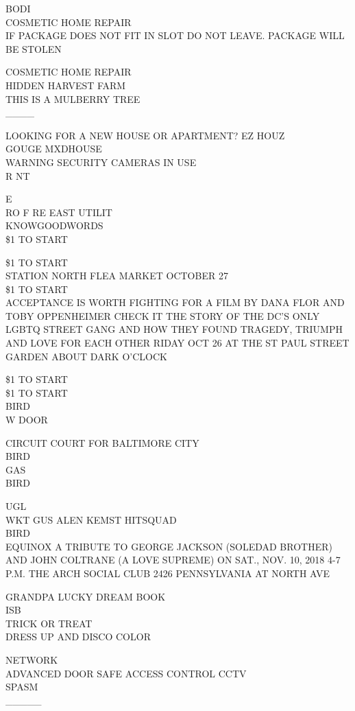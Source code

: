\documentclass[10pt,letterpaper]{article}
\begin{document}
BODI\\
COSMETIC HOME REPAIR\\
IF PACKAGE DOES NOT FIT IN SLOT DO NOT LEAVE.  PACKAGE WILL BE STOLEN

COSMETIC HOME REPAIR\\
HIDDEN HARVEST FARM\\
THIS IS A MULBERRY TREE\\
\_\_\_\_

LOOKING FOR A NEW HOUSE OR APARTMENT?  EZ HOUZ\\
GOUGE MXDHOUSE\\
WARNING SECURITY CAMERAS IN USE\\
R NT

E\\
RO F RE EAST UTILIT\\
KNOWGOODWORDS\\
\$1 TO START

\$1 TO START\\
STATION NORTH FLEA MARKET OCTOBER 27\\
\$1 TO START\\
ACCEPTANCE IS WORTH FIGHTING FOR A FILM BY DANA FLOR AND TOBY OPPENHEIMER CHECK IT THE STORY OF THE DC'S ONLY LGBTQ STREET GANG AND HOW THEY FOUND TRAGEDY, TRIUMPH AND LOVE FOR EACH OTHER RIDAY OCT 26 AT THE ST PAUL STREET GARDEN ABOUT DARK O'CLOCK

\$1 TO START\\
\$1 TO START\\
BIRD\\
W DOOR

CIRCUIT COURT FOR BALTIMORE CITY\\
BIRD\\
GAS\\
BIRD

UGL\\
WKT GUS ALEN KEMST HITSQUAD\\
BIRD\\
EQUINOX A TRIBUTE TO GEORGE JACKSON (SOLEDAD BROTHER) AND JOHN COLTRANE (A LOVE SUPREME) ON SAT., NOV. 10, 2018 4{-}7 P.M. THE ARCH SOCIAL CLUB 2426 PENNSYLVANIA AT NORTH AVE

GRANDPA LUCKY DREAM BOOK\\
ISB\\
TRICK OR TREAT\\
DRESS UP AND DISCO COLOR

NETWORK\\
ADVANCED DOOR SAFE ACCESS CONTROL CCTV\\
SPASM\\
\_\_\_\_\_
\end{document}
